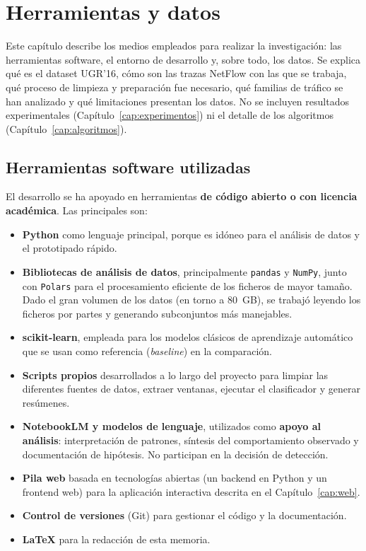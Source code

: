 \chapter{Herramientas y datos}
\label{cap:herramientas_datos}

Este capítulo describe los medios empleados para realizar la investigación: las herramientas software, el entorno de desarrollo y, sobre todo, los datos. Se explica qué es el dataset UGR'16, cómo son las trazas NetFlow con las que se trabaja, qué proceso de limpieza y preparación fue necesario, qué familias de tráfico se han analizado y qué limitaciones presentan los datos. No se incluyen resultados experimentales (Capítulo~\ref{cap:experimentos}) ni el detalle de los algoritmos (Capítulo~\ref{cap:algoritmos}).

\section{Herramientas software utilizadas}
\label{sec:herr_software}

El desarrollo se ha apoyado en herramientas \textbf{de código abierto o con licencia académica}. Las principales son:

\begin{itemize}
  \item \textbf{Python} como lenguaje principal, porque es idóneo para el análisis de datos y el prototipado rápido.
  \item \textbf{Bibliotecas de análisis de datos}, principalmente \texttt{pandas} y \texttt{NumPy}, junto con \texttt{Polars} para el procesamiento eficiente de los ficheros de mayor tamaño. Dado el gran volumen de los datos (en torno a 80~GB), se trabajó leyendo los ficheros por partes y generando subconjuntos más manejables.
  \item \textbf{scikit-learn}, empleada para los modelos clásicos de aprendizaje automático que se usan como referencia (\textit{baseline}) en la comparación.
  \item \textbf{Scripts propios} desarrollados a lo largo del proyecto para limpiar las diferentes fuentes de datos, extraer ventanas, ejecutar el clasificador y generar resúmenes.
  \item \textbf{NotebookLM y modelos de lenguaje}, utilizados como \textbf{apoyo al análisis}: interpretación de patrones, síntesis del comportamiento observado y documentación de hipótesis. No participan en la decisión de detección.
  \item \textbf{Pila web} basada en tecnologías abiertas (un backend en Python y un frontend web) para la aplicación interactiva descrita en el Capítulo~\ref{cap:web}.
  \item \textbf{Control de versiones} (Git) para gestionar el código y la documentación.
  \item \textbf{LaTeX} para la redacción de esta memoria.
\end{itemize}

